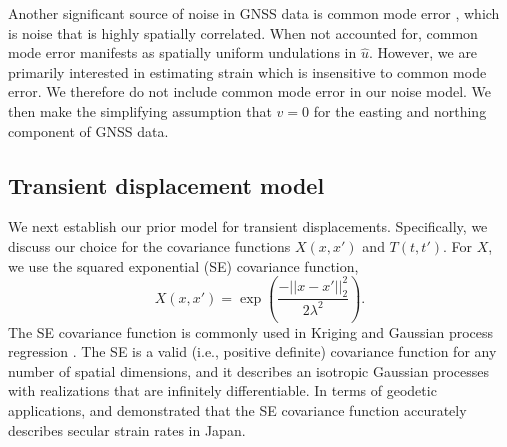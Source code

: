 \documentclass[10pt,letter]{article}
\begin{document}
Another significant source of noise in GNSS data is common mode error \citep[e.g.,][]{Wdowinski1997,Dong2006}, which is noise that is highly spatially correlated. When not accounted for, common mode error manifests as spatially uniform undulations in $\hat{u}$. However, we are primarily interested in estimating strain which is insensitive to common mode error. We therefore do not include common mode error in our noise model. We then make the simplifying assumption that $v = 0$ for the easting and northing component of GNSS data.            

\subsection{Transient displacement model}\label{sec:SignalModel}
We next establish our prior model for transient displacements. Specifically, we discuss our choice for the covariance functions $X(x,x')$ and $T(t,t')$. For $X$, we use the squared exponential (SE) covariance function,
\begin{equation}\label{eq:SE}
X(x,x') = \exp\left(\frac{-||x - x'||_2^2}{2 \lambda^2}\right).
\end{equation}
The SE covariance function is commonly used in Kriging \citep[e.g,][]{Cressie1992} and Gaussian process regression \citep[e.g.,][]{Rasmussen2006}.  The SE is a valid (i.e., positive definite) covariance function for any number of spatial dimensions, and it describes an isotropic Gaussian processes with realizations that are infinitely differentiable. In terms of geodetic applications, \citet{Kato1998} and \cite{El-Fiky1999} demonstrated that the SE covariance function accurately describes secular strain rates in Japan.  
\end{document}
